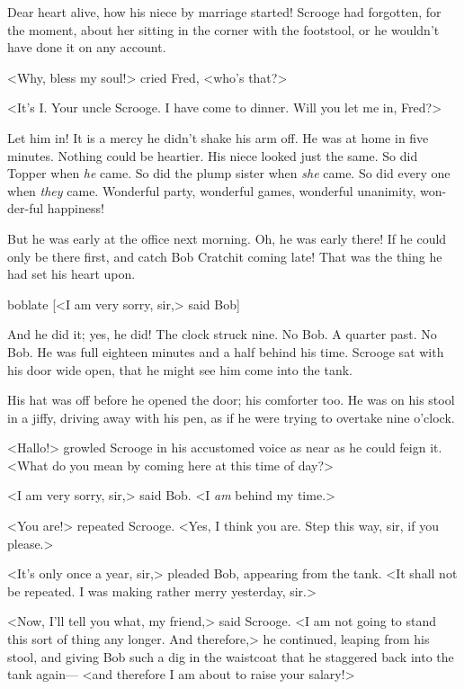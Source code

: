 Dear heart alive, how his niece by marriage started! Scrooge had forgotten, for
the moment, about her sitting in the corner with the footstool, or he wouldn't
have done it on any account.

<Why, bless my soul!> cried Fred, <who's that?>

<It's I\@. Your uncle Scrooge. I have come to dinner. Will you let me in, Fred?>

Let him in! It is a mercy he didn't shake his arm off. He was at home in five
minutes. Nothing could be heartier. His niece looked just the same. So did
Topper when \emph{he} came. So did the plump sister when \emph{she} came. So did
every one when \emph{they} came. Wonderful party, wonderful games, wonderful
unanimity, won-der-ful happiness!

But he was early at the office next morning. Oh, he was early there! If he could
only be there first, and catch Bob Cratchit coming late! That was the thing he
had set his heart upon.


  \begin{colorbigpic}
    [\basicscale] 
    {boblate}
    [<I am very sorry, sir,> said Bob]
  \end{colorbigpic}


And he did it; yes, he did! The clock struck nine. No Bob. A quarter past. No
Bob. He was full eighteen minutes and a half behind his time. Scrooge sat with
his door wide open, that he might see him come into the tank.

His hat was off before he opened the door; his comforter too. He was on his
stool in a jiffy, driving away with his pen, as if he were trying to overtake
nine o'clock.

<Hallo!> growled Scrooge in his accustomed voice as near as he could feign it.
<What do you mean by coming here at this time of day?>

<I am very sorry, sir,> said Bob. <I \emph{am} behind my time.>

<You are!> repeated Scrooge. <Yes, I think you are. Step this way, sir, if you
please.>

<It's only once a year, sir,> pleaded Bob, appearing from the tank. <It shall
not be repeated. I was making rather merry yesterday, sir.>

<Now, I'll tell you what, my friend,> said Scrooge. <I am not going to stand
this sort of thing any longer. And therefore,> he continued, leaping from his
stool, and giving Bob such a dig in the waistcoat that he staggered back into
the tank again— <and therefore I am about to raise your salary!>

